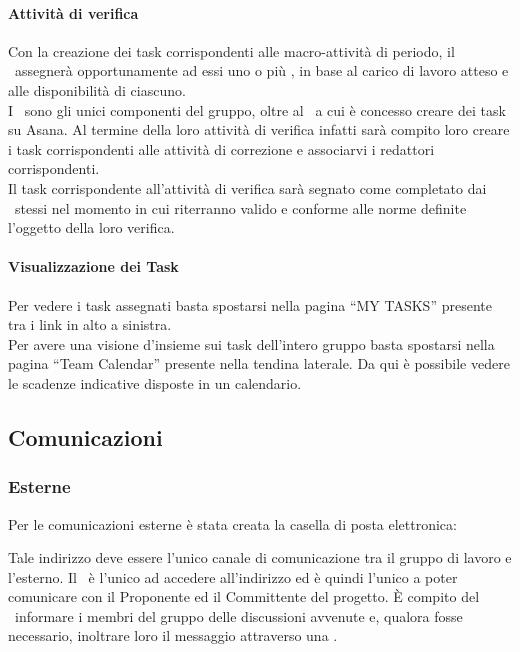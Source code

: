 \documentclass[../NormeDiProgetto.tex]{subfiles}
\begin{document}
				\paragraph{Attività di verifica\\}
					Con la creazione dei task corrispondenti alle macro-attività di periodo, il \responsabilediprogetto\ assegnerà opportunamente ad essi uno o più \verificatori, in base al carico di lavoro atteso e alle disponibilità di ciascuno. \\
					I \verificatori\ sono gli unici componenti del gruppo, oltre al \responsabilediprogetto\ a cui è concesso creare dei task su Asana. Al termine della loro attività di verifica infatti sarà compito loro creare i task corrispondenti alle attività di correzione e associarvi i redattori corrispondenti. \\
					Il task corrispondente all'attività di verifica sarà segnato come completato dai \verificatori\ stessi nel momento in cui riterranno valido e conforme alle norme definite l'oggetto della loro verifica.
				\paragraph{Visualizzazione dei Task\\}
				Per vedere i task assegnati basta spostarsi nella pagina ``MY
				TASKS'' presente tra i link in alto a sinistra.\\
				Per avere una visione d'insieme sui task dell'intero gruppo basta
				spostarsi nella pagina ``Team Calendar'' presente nella tendina
				laterale. Da qui è possibile vedere le scadenze indicative disposte
				in un calendario.
				
		\subsection{Comunicazioni}
			\subsubsection{Esterne}
				Per le comunicazioni esterne è stata creata la casella di posta
				elettronica:
				\begin{center}
					\mailkaleidoscode
				\end{center}
				Tale indirizzo deve essere l'unico canale di comunicazione tra il
				gruppo di lavoro e l'esterno.
				Il \responsabilediprogetto\ è l'unico ad accedere
				all'indirizzo ed è quindi l'unico a poter comunicare con il Proponente ed il
				Committente del progetto. È compito del \responsabilediprogetto\ informare
				i membri del gruppo delle discussioni avvenute e,
				qualora fosse necessario, inoltrare loro il messaggio attraverso
				una .
\end{document}
